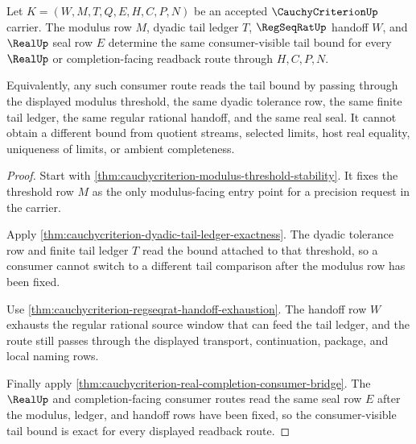 \begin{theorem}
\label{thm:cauchycriterion-modulus-tail-consumer-exactness}
Let $K=(W,M,T,Q,E,H,C,P,N)$ be an accepted $\CauchyCriterionUp$ carrier. The modulus row $M$, dyadic tail ledger $T$, $\RegSeqRatUp$ handoff $W$, and $\RealUp$ seal row $E$ determine the same consumer-visible tail bound for every $\RealUp$ or completion-facing readback route through $H,C,P,N$.

Equivalently, any such consumer route reads the tail bound by passing through the displayed modulus threshold, the same dyadic tolerance row, the same finite tail ledger, the same regular rational handoff, and the same real seal. It cannot obtain a different bound from quotient streams, selected limits, host real equality, uniqueness of limits, or ambient completeness.
\end{theorem}
\begin{proof}
Start with \autoref{thm:cauchycriterion-modulus-threshold-stability}. It fixes the threshold row $M$ as the only modulus-facing entry point for a precision request in the carrier.

Apply \autoref{thm:cauchycriterion-dyadic-tail-ledger-exactness}. The dyadic tolerance row and finite tail ledger $T$ read the bound attached to that threshold, so a consumer cannot switch to a different tail comparison after the modulus row has been fixed.

Use \autoref{thm:cauchycriterion-regseqrat-handoff-exhaustion}. The handoff row $W$ exhausts the regular rational source window that can feed the tail ledger, and the route still passes through the displayed transport, continuation, package, and local naming rows.

Finally apply \autoref{thm:cauchycriterion-real-completion-consumer-bridge}. The $\RealUp$ and completion-facing consumer routes read the same seal row $E$ after the modulus, ledger, and handoff rows have been fixed, so the consumer-visible tail bound is exact for every displayed readback route.
\end{proof}

